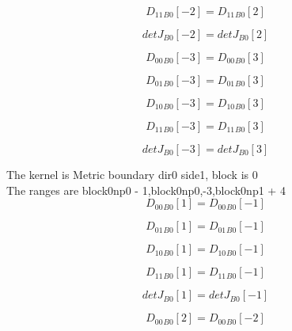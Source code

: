 \documentclass{article}
\begin{document}
\begin{dmath}{D_{11}{_{B0}}}[{-2}] = {D_{11}{_{B0}}}[{2}]\end{dmath}

\begin{dmath}{detJ{_{B0}}}[{-2}] = {detJ{_{B0}}}[{2}]\end{dmath}

\begin{dmath}{D_{00}{_{B0}}}[{-3}] = {D_{00}{_{B0}}}[{3}]\end{dmath}

\begin{dmath}{D_{01}{_{B0}}}[{-3}] = {D_{01}{_{B0}}}[{3}]\end{dmath}

\begin{dmath}{D_{10}{_{B0}}}[{-3}] = {D_{10}{_{B0}}}[{3}]\end{dmath}

\begin{dmath}{D_{11}{_{B0}}}[{-3}] = {D_{11}{_{B0}}}[{3}]\end{dmath}

\begin{dmath}{detJ{_{B0}}}[{-3}] = {detJ{_{B0}}}[{3}]\end{dmath}

\noindent The kernel is Metric boundary dir0 side1, block is 0\\\noindent The ranges are block0np0 - 1,block0np0,-3,block0np1 + 4\\\begin{dmath}{D_{00}{_{B0}}}[{1}] = {D_{00}{_{B0}}}[{-1}]\end{dmath}

\begin{dmath}{D_{01}{_{B0}}}[{1}] = {D_{01}{_{B0}}}[{-1}]\end{dmath}

\begin{dmath}{D_{10}{_{B0}}}[{1}] = {D_{10}{_{B0}}}[{-1}]\end{dmath}

\begin{dmath}{D_{11}{_{B0}}}[{1}] = {D_{11}{_{B0}}}[{-1}]\end{dmath}

\begin{dmath}{detJ{_{B0}}}[{1}] = {detJ{_{B0}}}[{-1}]\end{dmath}

\begin{dmath}{D_{00}{_{B0}}}[{2}] = {D_{00}{_{B0}}}[{-2}]\end{dmath}
\end{document}
